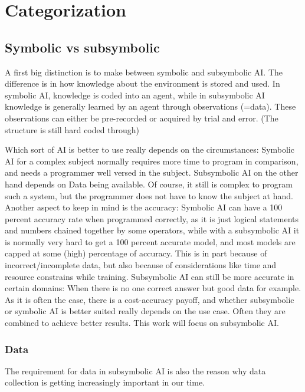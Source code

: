\chapter{Categorization}
\section{Symbolic vs subsymbolic}
A first big distinction is to make between symbolic and subsymbolic AI. 
The difference is in how knowledge about the environment is stored and used. %
In symbolic AI, knowledge is coded into an agent, while in subsymbolic AI knowledge is generally learned by an agent through observations (=data). These observations can either be pre-recorded or acquired by trial and error. (The structure is still hard coded through)

Which sort of AI is better to use really depends on the circumstances: 
Symbolic AI for a complex subject normally requires more time to program in comparison, and needs a programmer well versed in the subject. 
Subsymbolic AI on the other hand depends on Data being available. Of course, it still is complex to program such a system, but the programmer does not have to know the subject at hand. %
Another aspect to keep in mind is the accuracy: Symbolic AI can have a 100 percent accuracy rate when programmed correctly, as it is just logical statements and numbers chained together by some operators, while with a subsymbolic AI it is normally very hard to get a 100 percent accurate model, and most models are capped at some (high) percentage of accuracy. This is in part because of incorrect/incomplete data, but also because of considerations like time and resource constrains while training. Subsymbolic AI can still be more accurate in certain domains: When there is no one correct answer but good data for example.
As it is often the case, there is a cost-accuracy payoff, and whether subsymbolic or symbolic AI is better suited really depends on the use case. Often they are combined to achieve better results. This work will focus on subsymbolic AI. 
\subsection{Data}
The requirement for data in subsymbolic AI is also the reason why data collection is getting increasingly important in our time. 
